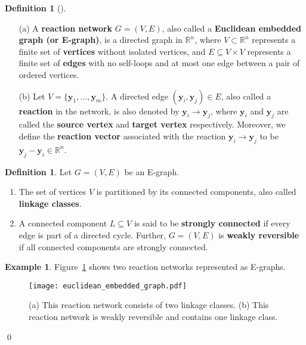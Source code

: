\documentclass[11pt]{article}
\theoremstyle{plain}
\theoremstyle{definition}
\newtheorem{definition}[theorem]{Definition}
\newtheorem{example}[theorem]{Example}
\theoremstyle{remark}
\newcommand\RR{\mathbb{R}}
\newcommand\by{\boldsymbol{y}}
\newcommand{\defi}{\textbf}
\begin{document}
\begin{definition}[\cite{craciun2015toric,craciun2020endotactic,craciun2019polynomial}]
\begin{enumerate}
\item[(a)] A \defi{reaction network} $G = (V, E)$, also called a \defi{Euclidean embedded graph (or E-graph)},
is a directed graph in $\RR^n$, where $V \subset \mathbb{R}^n$ represents a finite set of \defi{vertices} without isolated vertices, and $E \subseteq V \times V$ represents a finite set of \defi{edges} with no self-loops and at most one edge between a pair of ordered vertices.

\item[(b)] Let $V = \{ \by_1, \ldots, \by_m \}$. 
A directed edge $(\by_i, \by_j) \in E$, also called a \defi{reaction} in the network, is also denoted by $\by_i \to \by_j$, where $\by_i$ and $\by_j$ are called the \defi{source vertex} and \defi{target vertex} respectively.
Moreover, we define the \defi{reaction vector} associated with the reaction $\by_i \rightarrow \by_j$ to be $\by_j - \by_i \in\mathbb{R}^n$. 
\end{enumerate}
\end{definition}

\begin{definition} 
Let $G=(V, E)$ be an E-graph.
\begin{enumerate}[label=(\alph*)]
\item The set of vertices $V$ is partitioned by its connected components, also called \defi{linkage classes}.

\item A connected component $L \subseteq V$ is said to be \defi{strongly connected} if every edge is part of a directed cycle. 
Further, $G=(V, E)$ is \defi{weakly reversible} if all connected components are strongly connected.
\end{enumerate}
\end{definition}

\begin{example}
Figure~\ref{fig:e-graph} shows two reaction networks represented as E-graphs.

\begin{figure}[h!]
\centering
\texttt{[image: euclidean\_embedded\_graph.pdf]}
\caption{\small (a) This reaction network consists of two linkage classes. (b) This reaction network is weakly reversible and contains one linkage class.}
\label{fig:e-graph}
\end{figure} 
\qed
\end{example}
\end{document}
